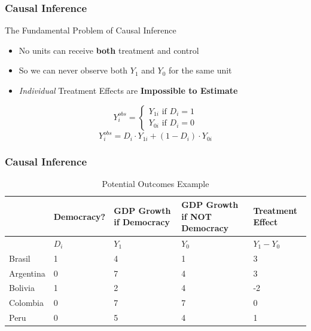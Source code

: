 \documentclass[xcolor=x11names,compress]{beamer}\usepackage[]{graphicx}\usepackage[]{color}
\renewcommand{\(}{\begin{columns}}
\renewcommand{\)}{\end{columns}}
\newcommand{\<}[1]{\begin{column}{#1}}
\renewcommand{\>}{\end{column}}
\begin{document}
\begin{frame}
\frametitle{Causal Inference}
\begin{block}{The Fundamental Problem of Causal Inference}
\begin{itemize}
\item No units can receive \textbf{both} treatment and control
\item So we can never observe both $Y_1$ and $Y_0$ for the same unit
\item \textit{Individual} Treatment Effects are \textbf{Impossible to Estimate}
\end{itemize}
\end{block}
\pause
\[
Y_{i}^{obs} = 
\begin{cases}
Y_{1i} \text{ if } D_i=1 \\
Y_{0i} \text{ if } D_i=0
\end{cases}
\]
\pause
$$Y_{i}^{obs} = D_i \cdot Y_{1i} + (1-D_i) \cdot Y_{0i}$$
\end{frame}

\begin{frame}
\frametitle{Causal Inference}
\footnotesize
\begin{table}[htbp]
  \centering
  \caption{Potential Outcomes Example}
    \begin{tabular}{|p{1.8cm}|p{1.8cm}|p{2cm}|p{2cm}|p{2cm}|}
    \hline
          & \multicolumn{1}{p{1.8cm}|}{Democracy?} & \multicolumn{1}{p{2cm}|}{GDP Growth if Democracy} & \multicolumn{1}{p{2.2cm}|}{GDP Growth if NOT Democracy} &  Treatment Effect \bigstrut\\
    \hline
          & \multicolumn{1}{p{1.8cm}|}{$D_i$} & \multicolumn{1}{p{2cm}|}{$Y_1$} & \multicolumn{1}{p{2.2cm}|}{$Y_0$} & \multicolumn{1}{p{1.8cm}|}{$Y_{1} - Y_{0}$} \bigstrut\\
    \hline
    Brasil & 1 & 4     & 1      & 3 \bigstrut\\
    \hline
    Argentina & 0 & 7    & 4      & 3 \bigstrut\\
    \hline
    Bolivia & 1 & 2     & 4     & -2 \bigstrut\\
    \hline
    Colombia & 0 &  7   & 7    & 0 \bigstrut\\
    \hline
    Peru & 0 & 5     & 4     & 1 \bigstrut\\
\hline
    \end{tabular}%
  \label{tab:addlabel}%
\end{table}%
\normalsize
\end{frame}
\end{document}
